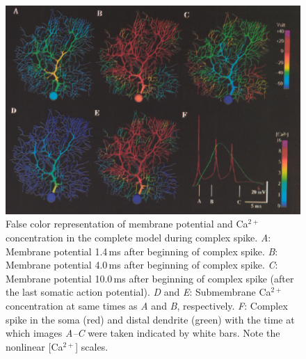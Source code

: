 \documentclass[12pt]{article}
\begin{document}
\clearpage

\begin{figure}[h]
\centering
   \includegraphics[scale=0.75]{figures/Fig.2.5.eps}
   \caption{False color representation of membrane potential and Ca$^{2+ }$ concentration in the complete model during complex spike. {\it A}: Membrane potential 1.4\,ms after beginning of complex spike. {\it B}: Membrane potential 4.0\,ms after beginning of complex spike. {\it C}: Membrane potential 10.0\,ms after beginning of complex spike (after the last somatic action potential). {\it D} and {\it E}: Submembrane Ca$^{2+}$ concentration at same times as {\it A} and {\it B}, respectively. {\it F}: Complex spike in the soma (red) and distal dendrite (green) with the time at which images {\it A--C} were taken indicated by white bars. Note the nonlinear [Ca$^{2+}$] scales.}
   \label{fig:DS2.5}
\end{figure}

\clearpage
\end{document}
